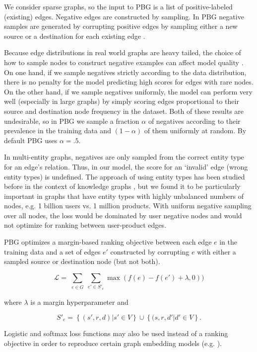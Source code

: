 \documentclass{article}
\begin{document}
We consider sparse graphs, so the input to PBG is a list of positive-labeled (existing) edges. Negative edges are constructed by sampling. In PBG negative samples are generated by corrupting positive edges by sampling either a new source or a destination for each existing edge \cite{transE}.

Because edge distributions in real world graphs are heavy tailed, the choice of how to sample nodes to construct negative examples can affect model quality \cite{mikolov2013efficient}. On one hand, if we sample negatives strictly according to the data distribution, there is no penalty for the model predicting high scores for edges with rare nodes. On the other hand, if we sample negatives uniformly, the model can perform very well (especially in large graphs) by simply scoring edges proportional to their source and destination node frequency in the dataset. Both of these results are undesirable, so in PBG we sample a fraction $\alpha$ of negatives according to their prevalence in the training data and $(1-\alpha)$ of them uniformly at random. By default PBG uses $\alpha=.5.$ 

In multi-entity graphs, negatives are only sampled from the correct entity type for an edge's relation. Thus, in our model, the score for an `invalid' edge (wrong entity types) is undefined. The approach of using entity types has been studied before in the context of knowledge graphs \cite{krompass2015type}, but we found it to be particularly important in graphs that have entity types with highly unbalanced numbers of nodes, e.g. 1 billion users vs. 1 million products. With uniform negative sampling over all nodes, the loss would be dominated by user negative nodes and would not optimize for ranking between user-product edges.

PBG optimizes a margin-based ranking objective between each edge $e$ in the training data and a set of edges $e'$ constructed by corrupting $e$ with either a sampled source or destination node (but not both).

\[
\label{math:loss}
\mathcal{L} = \sum_{\substack{e \in G}} \sum_{e'\in S'_e} \max(f(e) - f(e') + \lambda, 0))
\]

where $\lambda$ is a margin hyperparameter and

\[
\label{math:S}
S'_e = \left\{(s',r,d)|s'\in V\right\} \cup \left\{(s,r,d'|d'\in V\right\}.
\]

Logistic and softmax loss functions may also be used instead of a ranking objective in order to reproduce certain graph embedding models (e.g. \citealt{trouillon2016complex}).
\end{document}
